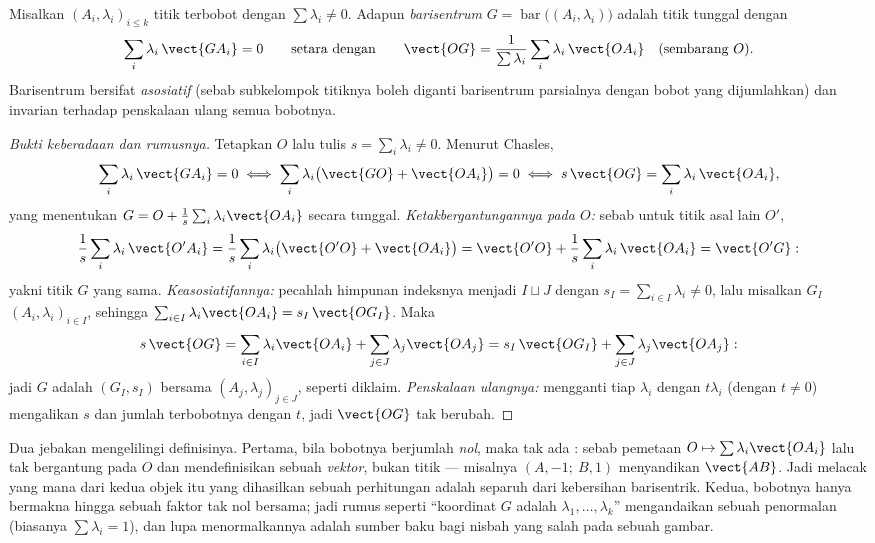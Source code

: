 \begin{definition}[Barisentrum]\label{def:b2:affine:barycenter}
Misalkan $(A_i, \lambda_i)_{i \leq k}$ titik terbobot dengan
$\sum\lambda_i \neq 0$. Adapun \emph{barisentrum} $G
= \operatorname{bar}\bigl((A_i, \lambda_i)\bigr)$ adalah titik tunggal
dengan
\[
\sum_i \lambda_i\, \vect{GA_i} = 0
\qquad\text{setara dengan}\qquad
\vect{OG} = \frac{1}{\sum\lambda_i}\sum_i \lambda_i\,\vect{OA_i}
\quad (\text{sembarang } O).
\]
Barisentrum bersifat \emph{asosiatif} (sebab subkelompok titiknya boleh
diganti barisentrum parsialnya dengan bobot yang dijumlahkan) dan
invarian terhadap penskalaan ulang semua bobotnya.
\end{definition}

\begin{proof}[Bukti keberadaan dan rumusnya]
Tetapkan $O$ lalu tulis $s = \sum_i\lambda_i \neq 0$. Menurut Chasles,
\[
\sum_i\lambda_i\,\vect{GA_i} = 0
\iff \sum_i\lambda_i\bigl(\vect{GO} + \vect{OA_i}\bigr) = 0
\iff s\,\vect{OG} = \sum_i\lambda_i\,\vect{OA_i},
\]
yang menentukan $G = O + \frac1s\sum_i\lambda_i\vect{OA_i}$
secara tunggal. \emph{Ketakbergantungannya pada $O$:} sebab untuk titik asal lain
$O'$,
\[
\frac1s\sum_i\lambda_i\,\vect{O'A_i}
= \frac1s\sum_i\lambda_i\bigl(\vect{O'O} + \vect{OA_i}\bigr)
= \vect{O'O} + \frac1s\sum_i\lambda_i\,\vect{OA_i}
= \vect{O'G} :
\]
yakni titik $G$ yang sama. \emph{Keasosiatifannya:} pecahlah himpunan indeksnya
menjadi $I \sqcup J$ dengan $s_I = \sum_{i\in I}\lambda_i \neq 0$,
lalu misalkan $G_I$  $(A_i, \lambda_i)_{i\in
I}$, sehingga $\sum_{i\in I}\lambda_i\vect{OA_i} =
s_I\,\vect{OG_I}$. Maka
\[
s\,\vect{OG}
= \sum_{i\in I}\lambda_i\vect{OA_i} +
\sum_{j\in J}\lambda_j\vect{OA_j}
= s_I\,\vect{OG_I} + \sum_{j\in J}\lambda_j\vect{OA_j} :
\]
jadi $G$ adalah  $(G_I, s_I)$ bersama $(A_j,
\lambda_j)_{j\in J}$, seperti diklaim. \emph{Penskalaan ulangnya:} mengganti
tiap $\lambda_i$ dengan $t\lambda_i$ (dengan $t \neq 0$) mengalikan $s$
dan jumlah terbobotnya dengan $t$, jadi $\vect{OG}$ tak berubah.
\end{proof}

\begin{remark}
Dua jebakan mengelilingi definisinya. Pertama, bila bobotnya berjumlah
\emph{nol}, maka tak ada : sebab pemetaan $O \mapsto
\sum\lambda_i\vect{OA_i}$ lalu tak bergantung pada $O$ dan
mendefinisikan sebuah \emph{vektor}, bukan titik --- misalnya
$(A, -1;\ B, 1)$ menyandikan $\vect{AB}$. Jadi melacak yang mana
dari kedua objek itu yang dihasilkan sebuah perhitungan adalah separuh dari
kebersihan barisentrik. Kedua, bobotnya hanya bermakna hingga
sebuah faktor tak nol bersama; jadi rumus seperti ``koordinat
$G$ adalah $\lambda_1, \dots, \lambda_k$'' mengandaikan sebuah
penormalan (biasanya $\sum\lambda_i = 1$), dan lupa
menormalkannya adalah sumber baku bagi nisbah yang salah pada
sebuah gambar.
\end{remark}

